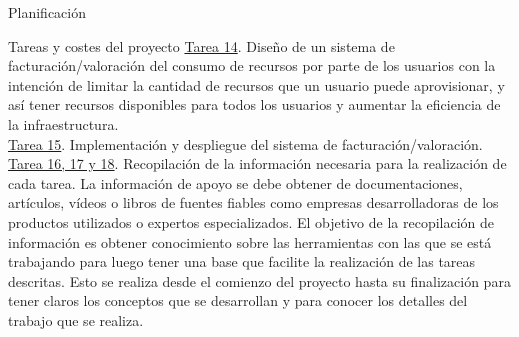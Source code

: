 \begin{chapter}{Planificación}
\begin{section}{Tareas y costes del proyecto}
\underline{Tarea 14}. Diseño de un sistema de facturación/valoración del consumo de recursos por parte de los usuarios con la intención de limitar la cantidad de recursos que un usuario puede aprovisionar, y así tener recursos disponibles para todos los usuarios y aumentar la eficiencia de la infraestructura.\\
\underline{Tarea 15}. Implementación y despliegue del sistema de facturación/valoración.\\
\underline{Tarea 16, 17 y 18}. Recopilación de la información necesaria para la realización de cada tarea. La información de apoyo se debe obtener de documentaciones, artículos, vídeos o libros de  fuentes fiables como empresas desarrolladoras de los productos utilizados o expertos especializados. El objetivo de la recopilación de información es obtener conocimiento sobre las herramientas con las que se está trabajando para luego tener una base que facilite la realización de las tareas descritas. Esto se realiza desde el comienzo del proyecto hasta su finalización para tener claros los conceptos que se desarrollan y para conocer los detalles del trabajo que se realiza.\\

\end{section}
\end{chapter}
